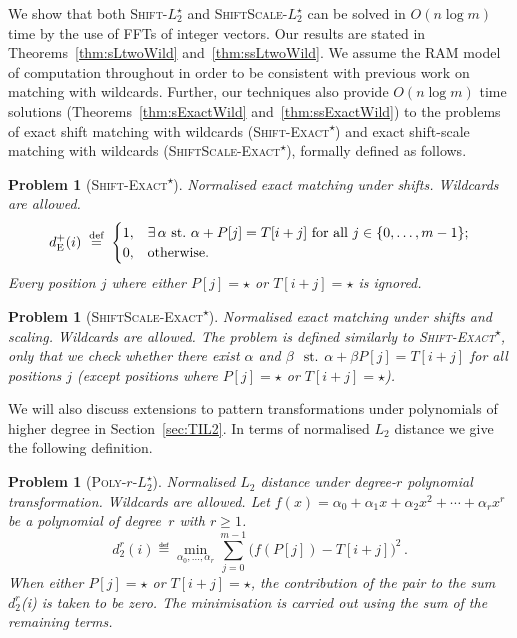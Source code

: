 \documentclass[11pt]{article}
\makeatletter
\renewcommand{\geq}{\geqslant}
\newcommand{\st}{\ensuremath{\text{ st.\@ }}}
\newcommand{\wildcard}{\ensuremath{\star}\xspace}
\newcommand{\sExactWild}{\textsc{Shift-Exact\textsuperscript{\wildcard}}\xspace}
\newcommand{\DsExactWild}{\ensuremath{d_{\textup{E}}^+}}
\newcommand{\ssExactWild}{\textsc{ShiftScale-Exact\textsuperscript{\wildcard}}\xspace}
\newcommand{\sLtwoWild}{\textsc{Shift-$L_2^\wildcard$}\xspace}
\newcommand{\ssLtwoWild}{\textsc{ShiftScale-$L_2^\wildcard$}\xspace}
\newcommand{\LpolyWild}{\textsc{Poly-$r$-$L_2^\wildcard$}\xspace}
\newcommand{\DLpolyWild}{\ensuremath{d_2^r}}
\theoremstyle{plain}
\newtheorem{problem}[theorem]{Problem}
\theoremstyle{definition}
\makeatother
\begin{document}
We show that both \sLtwoWild and \ssLtwoWild can be solved in $O(n\log{m})$ time by the use of FFTs of integer vectors. Our results are stated in Theorems~\ref{thm:sLtwoWild} and~\ref{thm:ssLtwoWild}. We assume the RAM model of computation throughout in order to be consistent with previous work on matching with wildcards. Further, our techniques also provide $O(n\log{m})$ time solutions (Theorems~\ref{thm:sExactWild} and~\ref{thm:ssExactWild}) to the problems of exact shift matching with wildcards (\sExactWild) and exact shift-scale matching with wildcards (\ssExactWild), formally defined as follows.

\begin{problem}[\sExactWild]
    \label{prob:sExactWild}
    Normalised exact matching under shifts. Wildcards are allowed.
\begin{equation*}
        \DsExactWild(i) \eqdef
            \begin{cases}
                1, & \text{$\exists\, \alpha$ st.\ $\alpha + P[j]=T[i+j]$ for all $j\in\{0,\ldots,m-1\}$;} \\
                0, & \text{otherwise.}
            \end{cases}
    \end{equation*}
Every position $j$ where either $P[j]=\wildcard$ or $T[i+j]=\wildcard$ is ignored.
\end{problem}

\begin{problem}[\ssExactWild]
    \label{prob:ssExactWild}
    Normalised exact matching under shifts and scaling. Wildcards are allowed. The problem is defined similarly to \sExactWild, only that we check whether there exist $\alpha$ and $\beta$ \st $\alpha + \beta P[j]=T[i+j]$ for all positions $j$ (except positions where $P[j]=\wildcard$ or $T[i+j]=\wildcard$).
\end{problem}

We will also discuss extensions to pattern transformations under polynomials of higher degree in Section~\ref{sec:TIL2}. In terms of normalised $L_2$ distance we give the following definition.

\begin{problem}[\LpolyWild]
    \label{prob:LpolyWild}
    Normalised $L_2$ distance under degree-$r$ polynomial transformation. Wildcards are allowed. Let $f(x)=\alpha_0 + \alpha_1 x + \alpha_2 x^2 + \cdots + \alpha_r x^r$ be a polynomial of degree~$r$ with $r\geq 1$.
\begin{equation*}
        \DLpolyWild(i) \eqdef \min_{\alpha_0,\ldots,\alpha_r} \sum_{j=0}^{m-1} \big(f(P[j]) - T[i+j]\big)^2 \,.
    \end{equation*}
When either $P[j]=\wildcard$ or $T[i+j]=\wildcard$, the contribution of the pair to the sum \DLpolyWild(i) is taken to be zero. The minimisation is carried out using the sum of the remaining terms.
\end{problem}
\end{document}
